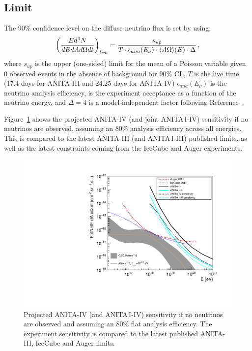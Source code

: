 \subsection{Limit}
\label{subsec:limit}
The 90\% confidence level on the diffuse neutrino flux is set by using:
\begin{equation}
\left( \dfrac{Ed^4N}{dE dA d\Omega dt}\right)_{lim} =
\dfrac{s_{up}}{ T \cdot \epsilon_{ana} (E_\nu) \cdot \langle A\Omega\rangle(E) \cdot \Delta} \, ,
\end{equation}
\noindent
where
$s_{up}$ is the upper (one-sided) limit for the mean of a Poisson
variable given 0 observed events in the absence of background for 90\%
CL, 
$T$ is the live time 
(17.4 days for ANITA-III and 24.25 days for ANITA-IV) 
$\epsilon_{ana}(E_\nu)$ is the neutrino analysis efficiency,
\effarea is the experiment acceptance as a function of the neutrino
energy, and $\Delta=4$ is a model-independent factor following Reference~\cite{PhysRevD.73.082002}.


Figure~\ref{fig:sensitivity} shows the projected ANITA-IV (and joint ANITA\,I-IV) sensitivity if no neutrinos are observed, assuming an 80\% analysis efficiency
across all energies. 
This is compared to the latest ANITA-III (and ANITA\,I-III) published limits, as well as the latest constraints coming from the IceCube and Auger experiments.


\begin{figure}[!h]\centering
 \includegraphics[width=.65\linewidth]{./Figs/LimitTemp_ANITA4.pdf}
 \caption{Projected ANITA-IV (and ANITA\,I-IV) sensitivity if no neutrinos are observed and assuming an 80\% flat analysis efficiency.
 The experiment sensitivity is compared to the latest published ANITA-III, IceCube and Auger limits.}
 \label{fig:sensitivity}
\end{figure}

